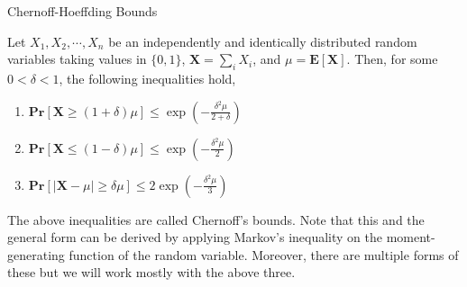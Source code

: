 \begin{frame}{Chernoff-Hoeffding Bounds}
    
    \begin{theorem}
        Let $X_1, X_2, \cdots, X_n$ be an independently and identically distributed random variables taking values in $\lbrace 0, 1 \rbrace$, $\textbf{X} = \sum_i X_i$, and $\mu = \mathbb{\mathbf{E}}[\textbf{X}]$. Then, for some $0 < \delta < 1$, the following inequalities hold,

        \begin{enumerate}
            \item $\textbf{Pr}[\textbf{X} \geq (1 + \delta)\mu] \leq \exp\left(-\frac{\delta^2 \mu}{2 + \delta}\right)$
            \item $\textbf{Pr}[\textbf{X} \leq (1 - \delta)\mu] \leq \exp\left(-\frac{\delta^2 \mu}{2}\right)$
            \item $\textbf{Pr}[|\textbf{X} - \mu| \geq \delta \mu ] \leq 2\exp\left(-\frac{\delta^2 \mu}{3}\right)$
        \end{enumerate}
    \end{theorem}
    The above inequalities are called Chernoff's bounds. Note that this and the general form can be derived by applying Markov's inequality on the moment-generating function of the random variable. Moreover, there are multiple forms of these but we will work mostly with the above three.
\end{frame}

